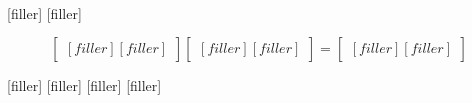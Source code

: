 \begin{align*} 
[filler]
[filler]
\end{align*}

[filler]
[filler]


$$
\begin{bmatrix} 
[filler]
[filler]
\end {bmatrix} 
\begin{bmatrix}
[filler]
[filler]
\end{bmatrix}
=
\begin{bmatrix}
[filler]
[filler]
\end{bmatrix}
$$


[filler]
[filler]
[filler]
[filler]


%    

%   
